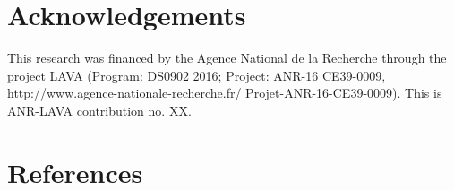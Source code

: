 \documentclass[11pt,a4paper]{article}
\begin{document}
\section*{Acknowledgements}
This research was financed by the Agence National de la Recherche through the project LAVA (Program: DS0902 2016; Project: ANR-16 CE39-0009, http://www.agence-nationale-recherche.fr/ Projet-ANR-16-CE39-0009). This is ANR-LAVA contribution no. XX.

\section*{References}

\end{document}
